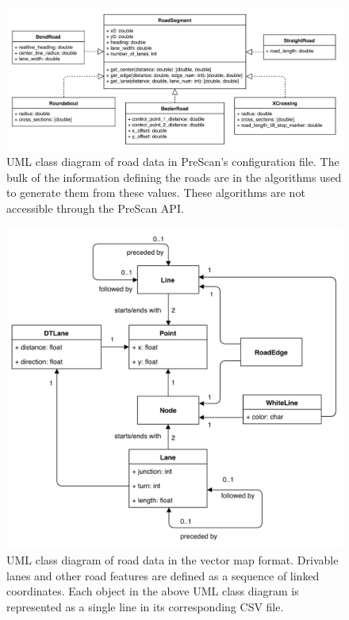 \documentclass[12pt,twoside]{article}
\begin{document}
\begin{figure}[ht]
    \centering
    \includegraphics[width=18cm,keepaspectratio]{pex-uml.png}
    \caption{UML class diagram of road data in PreScan's configuration file. The bulk of the information defining the roads are in the algorithms used to generate them from these values. These algorithms are not accessible through the PreScan API.}
    \label{fig:pex-uml}
\end{figure}

\begin{figure}[ht]
    \centering
    \includegraphics[width=12cm,keepaspectratio]{vmap-uml.png}
    \caption{UML class diagram of road data in the vector map format. Drivable lanes and other road features are defined as a sequence of linked coordinates. Each object in the above UML class diagram is represented as a single line in its corresponding CSV file.}
    \label{fig:vmap-uml}
\end{figure}
\end{document}
